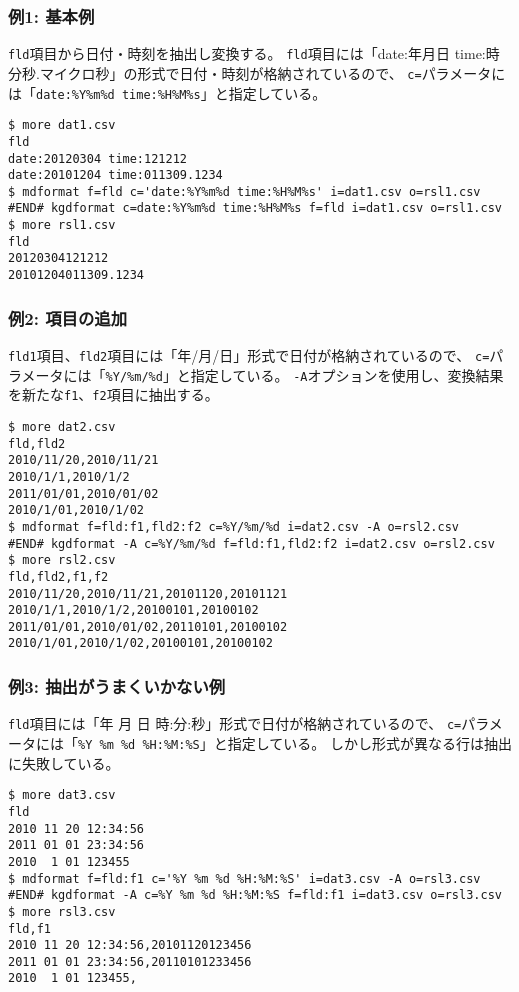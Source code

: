 \subsubsection*{例1: 基本例}

\verb|fld|項目から日付・時刻を抽出し変換する。
\verb|fld|項目には「date:年月日 time:時分秒.マイクロ秒」の形式で日付・時刻が格納されているので、
\verb|c=|パラメータには「\verb|date:%Y%m%d time:%H%M%s|」と指定している。


\begin{Verbatim}[baselinestretch=0.7,frame=single]
$ more dat1.csv
fld
date:20120304 time:121212
date:20101204 time:011309.1234
$ mdformat f=fld c='date:%Y%m%d time:%H%M%s' i=dat1.csv o=rsl1.csv
#END# kgdformat c=date:%Y%m%d time:%H%M%s f=fld i=dat1.csv o=rsl1.csv
$ more rsl1.csv
fld
20120304121212
20101204011309.1234
\end{Verbatim}
\subsubsection*{例2: 項目の追加}

\verb|fld1|項目、\verb|fld2|項目には「年/月/日」形式で日付が格納されているので、
\verb|c=|パラメータには「\verb|%Y/%m/%d|」と指定している。
\verb|-A|オプションを使用し、変換結果を新たな\verb|f1|、\verb|f2|項目に抽出する。


\begin{Verbatim}[baselinestretch=0.7,frame=single]
$ more dat2.csv
fld,fld2
2010/11/20,2010/11/21
2010/1/1,2010/1/2
2011/01/01,2010/01/02
2010/1/01,2010/1/02
$ mdformat f=fld:f1,fld2:f2 c=%Y/%m/%d i=dat2.csv -A o=rsl2.csv
#END# kgdformat -A c=%Y/%m/%d f=fld:f1,fld2:f2 i=dat2.csv o=rsl2.csv
$ more rsl2.csv
fld,fld2,f1,f2
2010/11/20,2010/11/21,20101120,20101121
2010/1/1,2010/1/2,20100101,20100102
2011/01/01,2010/01/02,20110101,20100102
2010/1/01,2010/1/02,20100101,20100102
\end{Verbatim}
\subsubsection*{例3: 抽出がうまくいかない例}

\verb|fld|項目には「年 月 日 時:分:秒」形式で日付が格納されているので、
\verb|c=|パラメータには「\verb|%Y %m %d %H:%M:%S|」と指定している。
しかし形式が異なる行は抽出に失敗している。


\begin{Verbatim}[baselinestretch=0.7,frame=single]
$ more dat3.csv
fld
2010 11 20 12:34:56
2011 01 01 23:34:56
2010  1 01 123455
$ mdformat f=fld:f1 c='%Y %m %d %H:%M:%S' i=dat3.csv -A o=rsl3.csv
#END# kgdformat -A c=%Y %m %d %H:%M:%S f=fld:f1 i=dat3.csv o=rsl3.csv
$ more rsl3.csv
fld,f1
2010 11 20 12:34:56,20101120123456
2011 01 01 23:34:56,20110101233456
2010  1 01 123455,
\end{Verbatim}
